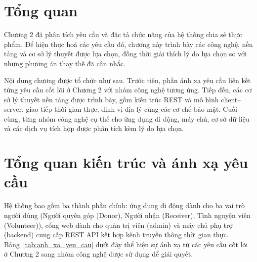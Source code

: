 \documentclass[../main.tex]{subfiles}%
\begin{document}
\setcounter{chapter}{3}
\ifSubfilesClassLoaded{%
  \nocite{FoodWasteReport2024,TheStateofFoodSecurityandNutrition2023}%
  \nocite{FoodWasteReport2021,CELConsulting2018,BaoTinTuc2024}%
  \nocite{ThuVienPhapLuat2025,FoodBankVietnam_Home,USDA_DangerZone}%
  \nocite{BoCongThuong_COP26,UN_Agenda2030,TooGoodToGo,Olio}%
}{}
\section{Tổng quan}

Chương 2 đã phân tích yêu cầu và đặc tả chức năng của hệ thống chia sẻ thực phẩm. Để hiện thực hoá các yêu cầu đó, chương này trình bày các công nghệ, nền tảng và cơ sở lý thuyết được lựa chọn, đồng thời giải thích lý do lựa chọn so với những phương án thay thế đã cân nhắc.

Nội dung chương được tổ chức như sau. Trước tiên, phần ánh xạ yêu cầu liên kết từng yêu cầu cốt lõi ở Chương 2 với nhóm công nghệ tương ứng. Tiếp đến, các cơ sở lý thuyết nền tảng được trình bày, gồm kiến trúc REST và mô hình client--server, giao tiếp thời gian thực, định vị địa lý cùng các cơ chế bảo mật. Cuối cùng, từng nhóm công nghệ cụ thể cho ứng dụng di động, máy chủ, cơ sở dữ liệu và các dịch vụ tích hợp được phân tích kèm lý do lựa chọn.

\section{Tổng quan kiến trúc và ánh xạ yêu cầu}
Hệ thống bao gồm ba thành phần chính: ứng dụng di động dành cho ba vai trò người dùng (Người quyên góp (Donor), Người nhận (Receiver), Tình nguyện viên (Volunteer)), cổng web dành cho quản trị viên (admin) và máy chủ phụ trợ (backend) cung cấp REST API kết hợp kênh truyền thông thời gian thực. Bảng~\ref{tab:anh_xa_yeu_cau} dưới đây thể hiện sự ánh xạ từ các yêu cầu cốt lõi ở Chương 2 sang nhóm công nghệ được sử dụng để giải quyết.
\end{document}
